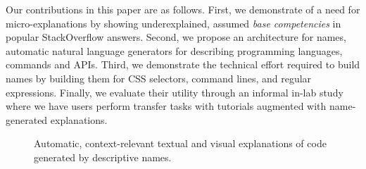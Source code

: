 Our contributions in this paper are as follows.
First, we demonstrate of a need for micro-explanations by showing underexplained, assumed \emph{base competencies} in popular StackOverflow answers.
Second, we propose an architecture for \glspl{name}, automatic natural language generators for describing programming languages, commands and APIs.
Third, we demonstrate the technical effort required to build \glspl{name} by building them for CSS selectors, command lines, and regular expressions.
Finally, we evaluate their utility through an informal in-lab study where we have users perform transfer tasks with tutorials augmented with \gls{name}-generated explanations.

\begin{figure}[!t]
\label{fig:tutorons}
\caption{Automatic, context-relevant textual and visual explanations of code generated by descriptive \glspl{name}.}
\end{figure}
